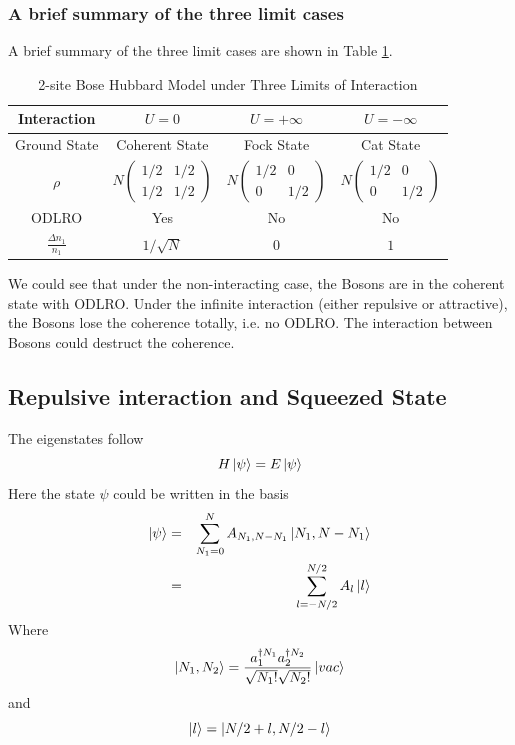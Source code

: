 \subsubsection{A brief summary of the three limit cases}
A brief summary of the three limit cases are shown in Table \ref{tab:1-1-2BoseLmt}.
\begin{table}[htbp]
\centering
\caption{2-site Bose Hubbard Model under Three Limits of Interaction }
\label{tab:1-1-2BoseLmt}
\begin{tabular}{|c|c|c|c|}
\hline
Interaction              & $U=0$          & $U=+\infty$ & $U=-\infty$ \\ \hline
Ground State             & Coherent State & Fock State  & Cat State   \\ \hline
$\rho$                   & $N\left(\begin{array}{cc} 
1/2 & 1/2\\
1/2 & 1/2
\end{array}\right)$             & $N\left(\begin{array}{cc}
1/2 & 0\\
0 & 1/2
\end{array}\right)$          & $N\left(\begin{array}{cc}
1/2 & 0\\
0 & 1/2
\end{array}\right)$          \\ \hline
ODLRO                    & Yes            & No          & No          \\ \hline
$\frac{\Delta n_1}{n_1}$ & $1/\sqrt{N}$   & $0$         & $1$         \\ \hline
\end{tabular}
\end{table}

We could see that under the non-interacting case, the Bosons are in the coherent state with ODLRO. Under the infinite interaction (either repulsive or attractive), the Bosons lose the coherence totally, i.e. no ODLRO.
The interaction between Bosons could destruct the coherence.

\subsection{Repulsive interaction and Squeezed State}
The eigenstates follow
\begin{equation}
H\ket \psi = E \ket \psi
\end{equation}
Here the state $\psi$ could be written in the basis
\begin{eqnarray}
\ket \psi &=& \sum_{N_1 = 0}^N A_{N_1, N-N_1} \ket{N_1, N-N_1}\\
&=& \sum_{l=-N/2}^{N/2} A_l \ket{l}
\end{eqnarray}
Where
\begin{equation}
\ket{N_1,N_2} = \frac{a_1^{\dag N_1} a_2^{\dag N_2}}{\sqrt{N_1!}\sqrt{N_2!}}\ket{vac}
\end{equation}
and
\begin{equation}
\ket{l} = \ket{N/2+l, N/2-l}
\end{equation}

